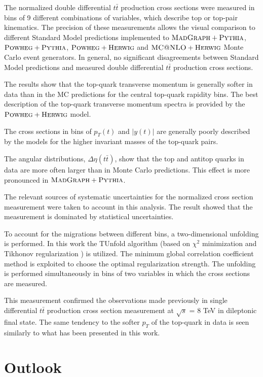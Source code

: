 The normalized double differential $t\bar{t}$ production cross sections were measured in bins of 9 different combinations of
variables, which describe top or top-pair kinematics. The precision of these measurements allows the visual comparison to different 
Standard Model predictions implemented to $\textsc{MadGraph}+\textsc{Pythia}$, $\textsc{Powheg}+\textsc{Pythia}$, $\textsc{Powheg}+\textsc{Herwig}$ and $\textsc{MC@NLO}+\textsc{Herwig}$ Monte Carlo
event generators. In general, no significant disagreements between Standard Model predictions and measured double differential
$t\bar{t}$ production cross sections.

The results show that the top-quark transverse momentum is generally softer in data than in the MC predictions for the central
top-quark rapidity bins. The best description of the top-quark transverse momentum spectra is provided by the $\textsc{Powheg}+\textsc{Herwig}$
model.

The cross sections in bins of $p_{T}(t)$ and $|y(t)|$ are generally poorly described by the models for the higher invariant masses
of the top-quark pairs.

The angular distributions, $\Delta\eta(t\bar{t})$, show that the top and antitop quarks in data are more often larger
than in Monte Carlo predictions. This effect is more pronounced in $\textsc{MadGraph}+\textsc{Pythia}$. 

The relevant sources of systematic uncertainties for the normalized cross section measurement were taken to account in this analysis.
The result showed that the measurement is dominated by statistical uncertainties.

To account for the migrations between different bins, a two-dimensional unfolding is performed. In this work the TUnfold 
algorithm\cite{Schmitt:2012kp} (based on $\chi^{2}$ minimization and Tikhonov regularization \cite{Tikhonov:1963}) is utilized. 
The minimum global correlation coefficient method\cite{VBlobelT} is exploited to choose the 
optimal regularization strength. The unfolding is performed simultaneously in bins of two variables in which the cross
sections are measured.

This measurement confirmed the observations made previously in single differential $t\bar{t}$ production cross section measurement
at $\sqrt{s}$ = 8 TeV\cite{Asin2014Auth} in dileptonic final state. The same tendency to the softer $p_{T}$ of the top-quark in 
data is seen similarly to what has been presented in this work.

\section{Outlook}

